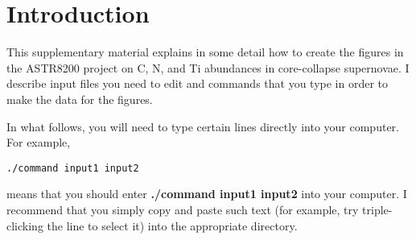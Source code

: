 \section*{Introduction}

%

This supplementary material explains in some detail how to create the figures in the ASTR8200 project on C, N, and Ti abundances in core-collapse supernovae.  I describe input files you need to edit and commands that you type in order to make the data for the figures.

In what follows, you will need to type certain lines directly into your computer.  For example, 
\begin{verbatim}
./command input1 input2
\end{verbatim}
means that you should enter {\bf ./command input1 input2} into your computer.  I recommend that you simply copy and paste such text (for example, try triple-clicking the line to select it) into the appropriate directory.
